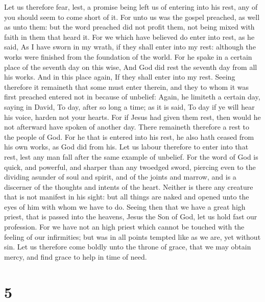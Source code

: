  Let us therefore fear, lest, a promise being left us of
entering into his rest, any of you should seem to come short of it.
 For unto us was the gospel preached, as well as unto
them: but the word preached did not profit them, not being mixed with
faith in them that heard it.  For we which have believed
do enter into rest, as he said, As I have sworn in my wrath, if they
shall enter into my rest: although the works were finished from the
foundation of the world.  For he spake in a certain place
of the seventh day on this wise, And God did rest the seventh day from
all his works.  And in this place again, If they shall
enter into my rest.  Seeing therefore it remaineth that
some must enter therein, and they to whom it was first preached entered
not in because of unbelief:  Again, he limiteth a certain
day, saying in David, To day, after so long a time; as it is said, To
day if ye will hear his voice, harden not your hearts. 
For if Jesus had given them rest, then would he not afterward have
spoken of another day.  There remaineth therefore a rest
to the people of God.  For he that is entered into his
rest, he also hath ceased from his own works, as God did from his.
 Let us labour therefore to enter into that rest, lest
any man fall after the same example of unbelief.  For the
word of God is quick, and powerful, and sharper than any twoedged sword,
piercing even to the dividing asunder of soul and spirit, and of the
joints and marrow, and is a discerner of the thoughts and intents of the
heart.  Neither is there any creature that is not
manifest in his sight: but all things are naked and opened unto the eyes
of him with whom we have to do.  Seeing then that we have
a great high priest, that is passed into the heavens, Jesus the Son of
God, let us hold fast our profession.  For we have not an
high priest which cannot be touched with the feeling of our infirmities;
but was in all points tempted like as we are, yet without sin.
 Let us therefore come boldly unto the throne of grace,
that we may obtain mercy, and find grace to help in time of need.

\hypertarget{section-4}{%
\section{5}\label{section-4}}

